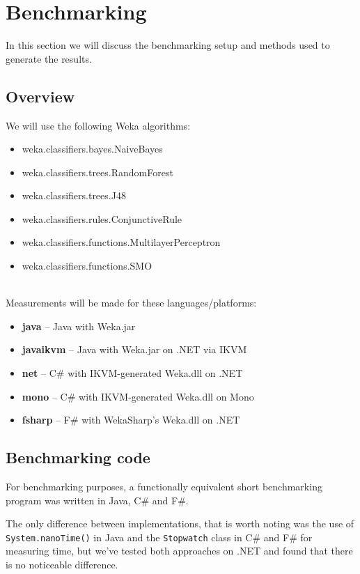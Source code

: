 \documentclass[journal]{IEEEtran/IEEEtran}
\newcommand\ver[1]{%
{\texttt{#1}}}
\newcommand\subsect[1]{\subsection{#1}\noindent}
\begin{document}
\section{Benchmarking}
In this section we will discuss the benchmarking setup and methods used to generate the results.
\subsect{Overview}We will use the following Weka algorithms:
\begin{itemize}
\item weka.classifiers.bayes.NaiveBayes
\item weka.classifiers.trees.RandomForest
\item weka.classifiers.trees.J48
\item weka.classifiers.rules.ConjunctiveRule
\item weka.classifiers.functions.MultilayerPerceptron
\item weka.classifiers.functions.SMO
\end{itemize}\ \\
Measurements will be made for these languages/platforms:
\begin{itemize}
\item \textbf{java} -- Java with Weka.jar
\item \textbf{javaikvm} -- Java with Weka.jar on .NET via IKVM
\item \textbf{net} -- C\# with IKVM-generated Weka.dll on .NET
\item \textbf{mono} -- C\# with IKVM-generated Weka.dll on Mono
\item \textbf{fsharp} -- F\# with WekaSharp's Weka.dll on .NET
\end{itemize}

\subsect{Benchmarking code}For benchmarking purposes, a functionally equivalent short benchmarking program was written in Java, C\# and F\#.

The only difference between implementations, that is worth noting was the use of \ver{System.nanoTime()} in Java and the \ver{Stopwatch} class in C\# and F\# for measuring time, but we've tested both approaches on .NET and found that there is no noticeable difference.
\end{document}
